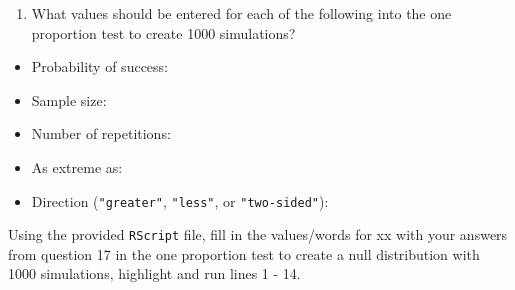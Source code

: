 \documentclass[
]{report}
\providecommand{\tightlist}{%
  \setlength{\itemsep}{0pt}\setlength{\parskip}{0pt}}
\begin{document}
\newpage

\begin{enumerate}
\def\labelenumi{\arabic{enumi}.}
\setcounter{enumi}{16}
\tightlist
\item
  What values should be entered for each of the following into the one proportion test to create 1000 simulations?
\end{enumerate}

\vspace{1mm}

\begin{itemize}
\tightlist
\item
  Probability of success:
\end{itemize}

\vspace{.2in}

\begin{itemize}
\tightlist
\item
  Sample size:
\end{itemize}

\vspace{.2in}

\begin{itemize}
\tightlist
\item
  Number of repetitions:
\end{itemize}

\vspace{.2in}

\begin{itemize}
\tightlist
\item
  As extreme as:
\end{itemize}

\vspace{.2in}

\begin{itemize}
\tightlist
\item
  Direction (\texttt{"greater"}, \texttt{"less"}, or \texttt{"two-sided"}):
\end{itemize}

\vspace{.2in}

Using the provided \texttt{RScript} file, fill in the values/words for xx with your answers from question 17 in the one proportion test to create a null distribution with 1000 simulations, highlight and run lines 1 - 14.
\end{document}

